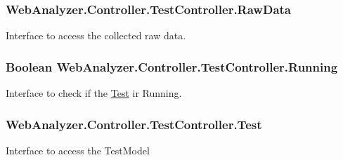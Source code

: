 \subsubsection[{Raw\+Data}]{ Web\+Analyzer.\+Controller.\+Test\+Controller.\+Raw\+Data\hspace{0.3cm}{\ttfamily [get]}}\label{class_web_analyzer_1_1_controller_1_1_test_controller_a3ec6bf7552cde054fdffaa8a1a6cf981}


Interface to access the collected raw data. 

\hypertarget{class_web_analyzer_1_1_controller_1_1_test_controller_a4020785450ade4a26f603d667ce633d6}{}
\subsubsection[{Running}]{\setlength{\rightskip}{0pt plus 5cm}Boolean Web\+Analyzer.\+Controller.\+Test\+Controller.\+Running\hspace{0.3cm}{\ttfamily [get]}}\label{class_web_analyzer_1_1_controller_1_1_test_controller_a4020785450ade4a26f603d667ce633d6}


Interface to check if the \hyperlink{namespace_web_analyzer_1_1_test}{Test} ir Running. 

\hypertarget{class_web_analyzer_1_1_controller_1_1_test_controller_afcf9572f80c31e6d9aca33f96e3aaa4f}{}
\subsubsection[{Test}]{ Web\+Analyzer.\+Controller.\+Test\+Controller.\+Test\hspace{0.3cm}{\ttfamily [get]}}\label{class_web_analyzer_1_1_controller_1_1_test_controller_afcf9572f80c31e6d9aca33f96e3aaa4f}


Interface to access the Test\+Model 

\hypertarget{class_web_analyzer_1_1_controller_1_1_test_controller_adc0db19e3cc5958f24dd5fd09ce34d98}{}
